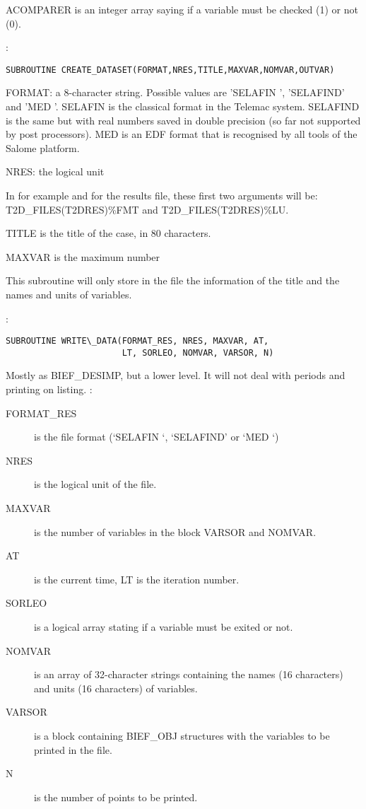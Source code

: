 ACOMPARER is an integer array saying if a variable must be checked
(1) or not (0).

:
\begin{lstlisting}[language=TelFortran]
SUBROUTINE CREATE_DATASET(FORMAT,NRES,TITLE,MAXVAR,NOMVAR,OUTVAR)
\end{lstlisting}

FORMAT: a 8-character string. Possible values are 'SELAFIN ', 'SELAFIND' and
'MED     '. SELAFIN is the classical format in the Telemac system. SELAFIND is
the same but with real numbers saved in double precision (so far not supported
by post processors). MED is an EDF format that is recognised by all tools of
the Salome platform.

NRES: the logical unit

In  for example and for the results file, these first two arguments
will be:\\
T2D\_FILES(T2DRES)\%FMT and T2D\_FILES(T2DRES)\%LU.

TITLE is the title of the case, in 80 characters.

MAXVAR is the maximum number

This subroutine will only store in the file the information of the title and
the names and units of variables.

:
\begin{lstlisting}[language=TelFortran]
SUBROUTINE WRITE\_DATA(FORMAT_RES, NRES, MAXVAR, AT,
                       LT, SORLEO, NOMVAR, VARSOR, N)
\end{lstlisting}

Mostly as BIEF\_DESIMP, but a lower level. It will not deal with periods and
printing on listing.
:
\begin{description}
  \item [FORMAT\_RES] is the file format (`SELAFIN `, `SELAFIND' or `MED     `)
  \item [NRES] is the logical unit of the file.
  \item [MAXVAR] is the number of variables in the block VARSOR and NOMVAR.
  \item [AT] is the current time, LT is the iteration number.
  \item [SORLEO] is a logical array stating if a variable must be exited or
    not.
  \item [NOMVAR] is an array of 32-character strings containing the names (16
    characters) and units (16 characters) of variables.
  \item [VARSOR] is a block containing BIEF\_OBJ structures with the variables
    to be printed in the file.
  \item [N] is the number of points to be printed.
\end{description}

